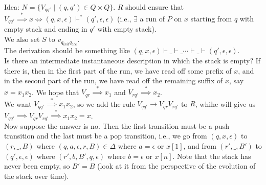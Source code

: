 \documentclass[a4paper]{article}
\newcommand{\nl}{\vspace{0.2cm}\\}
\newcommand{\produces}{\implies}
\newcommand{\derives}{\stackrel{*}{\implies}}
\newcommand{\changesto}{\vdash}
\begin{document}
\begin{note}
    Idea: $N = \{V_{qq'} \mid (q, q') \in Q \times Q\}$. $R$ should ensure that $V_{qq'} \derives x \iff (q, x, \epsilon) \changesto^* (q', \epsilon, \epsilon)$ (i.e., $\exists$ a run of $P$ on $x$ starting from $q$ with empty stack and ending in $q'$
        with empty stack).\nl
        We also set $S$ to $v_{q_{init}q_{acc}}$.\nl
        The derivation should be something like $(q, x, \epsilon) \changesto \_ \changesto \_ \cdots \changesto \_ \changesto (q', \epsilon, \epsilon)$.\nl
        Is there an intermediate instantaneous description in which the stack is empty?
        If there is, then in the first part of the run, we have read off some prefix of $x$, and in the second part of the run, we have read off the remaining suffix of $x$, say $x = x_1 x_2$. We
        hope that $V_{qr} \derives x_1$ and $V_{rq'} \derives x_2$.\nl
        We want $V_{qq'} \derives x_1 x_2$, so we add the rule $V_{qq'} \to V_{qr} V_{rq'}$ to $R$, whihc will give us $V_{qq'} \produces V_{qr} V_{rq'} \derives x_1 x_2 = x$.\nl
        Now suppose the answer is no. Then the first transition must be a push transition and the last must be a pop transition, i.e., we go from $(q, x, \epsilon)$ to $(r, \_, B)$ where
        $(q, a, \epsilon, r, B) \in \Delta$ where $a = \epsilon$ or $x[1]$, and from $(r', \_, B')$ to $(q', \epsilon, \epsilon)$ where $(r', b, B', q
        , \epsilon)$ where $b = \epsilon$ or $x[n]$.
        Note that the stack has never been empty, so $B' = B$ (look at it from the perspective of the evolution of the stack over time).
\end{note}
\end{document}
